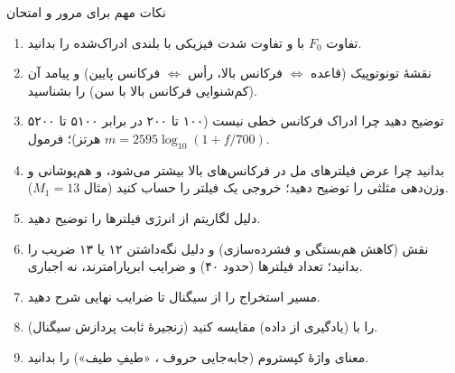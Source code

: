 \begin{exambox}{نکات مهم برای مرور و امتحان}
\begin{enumerate}
  \item تفاوت $F_0$ با  و تفاوت شدت فیزیکی با بلندی ادراک‌شده را بدانید.
  \item نقشهٔ تونوتوپیک (قاعده $\Leftrightarrow$ فرکانس بالا، رأس $\Leftrightarrow$ فرکانس پایین) و پیامد آن (کم‌شنوایی فرکانس بالا با سن) را بشناسید.
  \item توضیح دهید چرا ادراک فرکانس خطی نیست (۱۰۰ تا ۲۰۰ در برابر ۵۱۰۰ تا ۵۲۰۰ هرتز)؛ فرمول $m=2595\log_{10}(1+f/700)$.
  \item بدانید چرا عرض فیلترهای مل در فرکانس‌های بالا بیشتر می‌شود، و هم‌پوشانی و وزن‌دهی مثلثی را توضیح دهید؛ خروجی یک فیلتر را حساب کنید (مثال $M_1=13$).
  \item دلیل لگاریتم از انرژی فیلترها را توضیح دهید.
  \item نقش  (کاهش هم‌بستگی و فشرده‌سازی) و دلیل نگه‌داشتن ۱۲ یا ۱۳ ضریب را بدانید؛ تعداد فیلترها (حدود ۴۰) و ضرایب ابرپارامترند، نه اجباری.
  \item مسیر استخراج  را از سیگنال تا ضرایب نهایی شرح دهید.
  \item {} (زنجیرهٔ ثابت پردازش سیگنال) را با  (یادگیری از داده) مقایسه کنید.
  \item معنای واژهٔ کپستروم (جابه‌جایی حروف ، «طیفِ طیف») را بدانید.
\end{enumerate}
\end{exambox}
